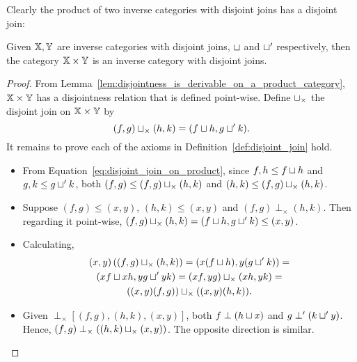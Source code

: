 Clearly the product of two inverse categories with disjoint joins has a disjoint join:
\begin{lemma}\label{lem:disjoint_join_is_in_product_category}
  Given $\mathbb{X}, \mathbb{Y}$ are inverse categories with disjoint joins, $\sqcup$ and $\sqcup'$ respectively,
  then the category $\mathbb{X} \times \mathbb{Y}$ is an inverse category with disjoint joins.
\end{lemma}
\begin{proof}
  From Lemma~\ref{lem:disjointness_is_derivable_on_a_product_category}, $\mathbb{X}\times\mathbb{Y}$ has a
  disjointness relation that is defined point-wise.  Define $\sqcup_{\times}$ the
  disjoint join on $\mathbb{X}\times\mathbb{Y}$ by
  \begin{equation}
    (f,g)\sqcup_{\times}(h,k) = (f \sqcup h, g \sqcup' k). \label{eq:disjoint_join_on_product}
  \end{equation}
  It remains to prove each of the axioms in Definition~\ref{def:disjoint_join} hold.
  \begin{itemize}
    \item [\axiom{DJ}{1}] From Equation~\ref{eq:disjoint_join_on_product},  since
      $f,h \le f \sqcup h$ and $g,k \le g \sqcup' k$, both $(f,g) \le (f,g)\sqcup_{\times}(h,k)$
      and  $(h,k) \le (f,g)\sqcup_{\times}(h,k)$.
    \item [\axiom{DJ}{2}] Suppose $(f,g) \le (x,y)$, $(h,k) \le (x,y)$ and $(f,g) \perp_{\times}
      (h,k)$. Then regarding it point-wise, $(f,g)\sqcup_{\times}(h,k) = (f \sqcup h, g
      \sqcup' k) \le (x,y)$.
    \item [\axiom{DJ}{3}] Calculating,
      \begin{multline*}
        (x,y)\left((f,g)\sqcup_{\times}(h,k)\right) = (x(f \sqcup h), y(g  \sqcup' k)) = \\
        (x f \sqcup x h, y g \sqcup' y k) = (x f,y g)\sqcup_{\times}(x h,y k) =\\
        ((x,y)(f,g))\sqcup_{\times}((x,y)(h,k)).
      \end{multline*}
  \item [\axiom{DJ}{4}] Given $\perp_{\times}\!\![(f,g),(h,k),(x,y)]$,  both $f \perp (h\sqcup
      x)$ and $g \perp' (k\sqcup' y)$. Hence, $(f,g) \perp_{\times}((h,k)\sqcup_{\times}(x,y))$. The
      opposite direction is similar.
  \end{itemize}
\end{proof}

